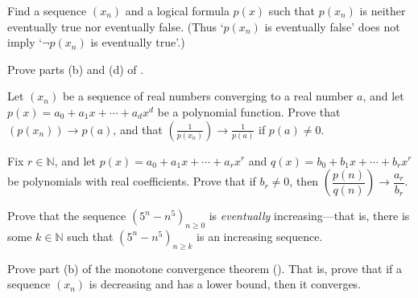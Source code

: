 \begin{exercise}
Find a sequence $(x_n)$ and a logical formula $p(x)$ such that $p(x_n)$ is neither eventually true nor eventually false. (Thus `$p(x_n)$ is eventually false' does not imply `$\neg p(x_n)$ is eventually true'.)
\end{exercise}


\begin{exercise}
Prove parts (b) and (d) of .
\end{exercise}


\begin{exercise}
\label{exPolynomialsAreContinuousUsingSequences}
Let $(x_n)$ be a sequence of real numbers converging to a real number $a$, and let $p(x) = a_0 + a_1x + \cdots + a_d x^d$ be a polynomial function. Prove that $(p(x_n)) \to p(a)$, and that $\left( \frac{1}{p(x_n)} \right) \to \frac{1}{p(a)}$ if $p(a) \ne 0$.
\end{exercise}



\begin{exercise}
Fix $r \in \mathbb{N}$, and let $p(x) = a_0 + a_1 x + \cdots + a_r x^r$ and $q(x) = b_0 + b_1 x + \cdots + b_r x^r$ be polynomials with real coefficients. Prove that if $b_r \ne 0$, then $\left( \dfrac{p(n)}{q(n)} \right) \to \dfrac{a_r}{b_r}$.
\end{exercise}


\begin{exercise}
Prove that the sequence $(5^n-n^5)_{n \ge 0}$ is \textit{eventually} increasing---that is, there is some $k \in \mathbb{N}$ such that $(5^n-n^5)_{n \ge k}$ is an increasing sequence.
\end{exercise}



\begin{exercise}
\label{exMonotoneConvergenceForDecreasingSequences}
Prove part (b) of the monotone convergence theorem (). That is, prove that if a sequence $(x_n)$ is decreasing and has a lower bound, then it converges.
\end{exercise}


